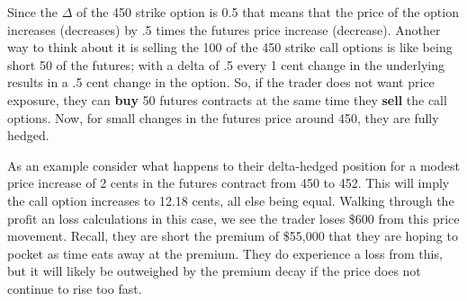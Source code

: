 \documentclass[
  letterpaper,
  DIV=11,
  numbers=noendperiod]{scrreprt}
\begin{document}
Since the \(\Delta\) of the 450 strike option is 0.5 that means that the
price of the option increases (decreases) by .5 times the futures price
increase (decrease). Another way to think about it is selling the 100 of
the 450 strike call options is like being short 50 of the futures; with
a delta of .5 every 1 cent change in the underlying results in a .5 cent
change in the option. So, if the trader does not want price exposure,
they can \textbf{buy} 50 futures contracts at the same time they
\textbf{sell} the call options. Now, for small changes in the futures
price around 450, they are fully hedged.

As an example consider what happens to their delta-hedged position for a
modest price increase of 2 cents in the futures contract from 450 to
452. This will imply the call option increases to 12.18 cents, all else
being equal. Walking through the profit an loss calculations in this
case, we see the trader loses \$600 from this price movement. Recall,
they are short the premium of \$55,000 that they are hoping to pocket as
time eats away at the premium. They do experience a loss from this, but
it will likely be outweighed by the premium decay if the price does not
continue to rise too fast.
\end{document}
